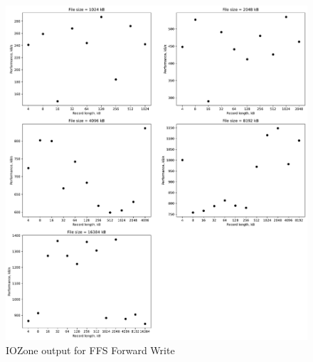 \begin{figure}[!htb]
	\label{fig:app_bench_ffs_write}
	\begin{center}
		\includegraphics[width=1.0\textwidth]{figures/benchmarking/ffs/Write.pdf}
	\end{center}
	\caption{IOZone output for FFS Forward Write}
\end{figure}

